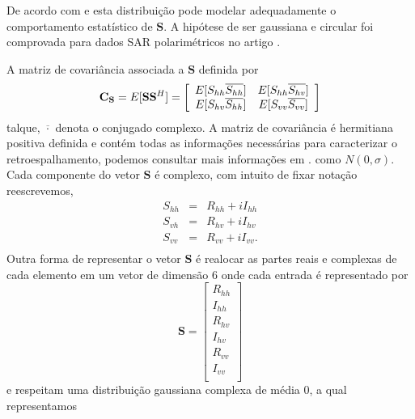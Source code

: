 \documentclass[conference]{IEEEtran}
\begin{document}
De acordo com \cite{good} e \cite{lee} esta distribuição pode modelar adequadamente o comportamento estatístico de $\mathbf{S}$. A hipótese de ser gaussiana e circular foi comprovada para dados SAR polarimétricos no artigo \cite{sarabendi}.   

A matriz de covariância associada a $\mathbf{S}$ definida por
\begin{equation}
	{\bf C_{{\bf S}}} = E[{\mathbf S}{\mathbf S}^H] = \left[
\begin{array}{cc}
	E[S_{hh}\overline{S_{hh}}]  & E[{S_{hh}}\overline{S_{hv}}]   \\
	E[S_{hv}\overline{S_{hh}}]  & E[{S_{vv}}\overline{S_{vv}}]  \\
\end{array}
\right]
\end{equation}
talque, $\overline{\cdot}$ denota o conjugado complexo. A matriz de covariância é hermitiana positiva definida e contém todas as informações necessárias para caracterizar o retroespalhamento, podemos consultar mais informações em \cite{mfp}. como $N(0,\sigma)$.
Cada componente do vetor $\mathbf{S}$ é complexo, com intuito de fixar notação reescrevemos,
\begin{equation}
\begin{array}{ccc}
	S_{hh} &=& R_{hh} + i I_{hh}    \\
    S_{vh} &=& R_{hv} + i I_{hv}   \\
	S_{vv} &=& R_{vv} + i I_{vv}.   \\
\end{array}
\end{equation}
Outra forma de representar o vetor $\mathbf{S}$ é realocar as partes reais e complexas de cada elemento em um vetor de dimensão $6$ onde cada entrada é representado por
\begin{equation}
\mathbf{S} = \left[
\begin{array}{c}
	R_{hh}     \\
    I_{hh}     \\
	R_{hv}     \\
	I_{hv}     \\
    R_{vv}     \\
	I_{vv}     \\
\end{array}
\right]
\end{equation}
e respeitam uma distribuição gaussiana complexa de média 0, a qual representamos 
\end{document}
